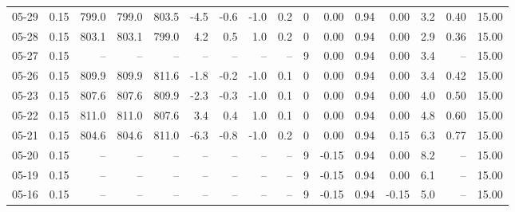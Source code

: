 \begin{threeparttable}
{\begin{tabular}{lrrrrrrrrrrrrrrr}
  05-29 &     0.15 & 799.0 & 799.0 & 803.5 &       -4.5 &           -0.6 &                     -1.0 &                 0.2 &              0 &       0.00 &      0.94 &           0.00 &              3.2 &            0.40 &                  15.00 \\
  05-28 &     0.15 & 803.1 & 803.1 & 799.0 &        4.2 &            0.5 &                      1.0 &                 0.2 &              0 &       0.00 &      0.94 &           0.00 &              2.9 &            0.36 &                  15.00 \\
  05-27 &     0.15 &    -- &    -- &    -- &         -- &             -- &                       -- &                  -- &              9 &       0.00 &      0.94 &           0.00 &              3.4 &              -- &                  15.00 \\
  05-26 &     0.15 & 809.9 & 809.9 & 811.6 &       -1.8 &           -0.2 &                     -1.0 &                 0.1 &              0 &       0.00 &      0.94 &           0.00 &              3.4 &            0.42 &                  15.00 \\
  05-23 &     0.15 & 807.6 & 807.6 & 809.9 &       -2.3 &           -0.3 &                     -1.0 &                 0.1 &              0 &       0.00 &      0.94 &           0.00 &              4.0 &            0.50 &                  15.00 \\
  05-22 &     0.15 & 811.0 & 811.0 & 807.6 &        3.4 &            0.4 &                      1.0 &                 0.1 &              0 &       0.00 &      0.94 &           0.00 &              4.8 &            0.60 &                  15.00 \\
  05-21 &     0.15 & 804.6 & 804.6 & 811.0 &       -6.3 &           -0.8 &                     -1.0 &                 0.2 &              0 &       0.00 &      0.94 &           0.15 &              6.3 &            0.77 &                  15.00 \\
  05-20 &     0.15 &    -- &    -- &    -- &         -- &             -- &                       -- &                  -- &              9 &      -0.15 &      0.94 &           0.00 &              8.2 &              -- &                  15.00 \\
  05-19 &     0.15 &    -- &    -- &    -- &         -- &             -- &                       -- &                  -- &              9 &      -0.15 &      0.94 &           0.00 &              6.1 &              -- &                  15.00 \\
  05-16 &     0.15 &    -- &    -- &    -- &         -- &             -- &                       -- &                  -- &              9 &      -0.15 &      0.94 &          -0.15 &              5.0 &              -- &                  15.00 \\

\end{tabular}}
\end{threeparttable}
